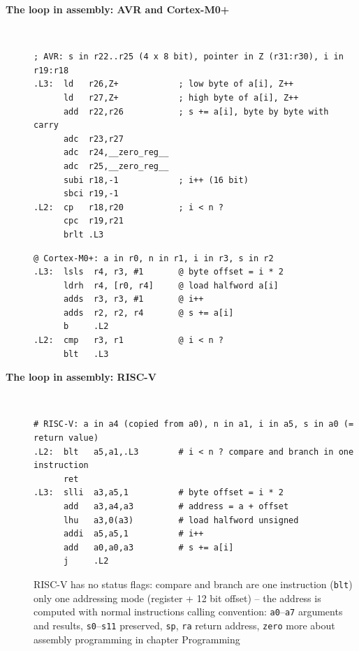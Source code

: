 \begin{description}
\item[{\rot\bf The loop in assembly: AVR and Cortex-M0+}]~\\[-\lstskip]
\begin{lstlisting}[language={}]
; AVR: s in r22..r25 (4 x 8 bit), pointer in Z (r31:r30), i in r19:r18
.L3:  ld   r26,Z+            ; low byte of a[i], Z++
      ld   r27,Z+            ; high byte of a[i], Z++
      add  r22,r26           ; s += a[i], byte by byte with carry
      adc  r23,r27
      adc  r24,__zero_reg__
      adc  r25,__zero_reg__
      subi r18,-1            ; i++ (16 bit)
      sbci r19,-1
.L2:  cp   r18,r20           ; i < n ?
      cpc  r19,r21
      brlt .L3
\end{lstlisting}
\begin{lstlisting}[language={}]
@ Cortex-M0+: a in r0, n in r1, i in r3, s in r2
.L3:  lsls  r4, r3, #1       @ byte offset = i * 2
      ldrh  r4, [r0, r4]     @ load halfword a[i]
      adds  r3, r3, #1       @ i++
      adds  r2, r2, r4       @ s += a[i]
      b     .L2
.L2:  cmp   r3, r1           @ i < n ?
      blt   .L3
\end{lstlisting}
\os{\newpage}

\item[{\rot\bf The loop in assembly: RISC-V}]~\\[-\lstskip]
\begin{lstlisting}[language={}]
# RISC-V: a in a4 (copied from a0), n in a1, i in a5, s in a0 (= return value)
.L2:  blt   a5,a1,.L3        # i < n ? compare and branch in one instruction
      ret
.L3:  slli  a3,a5,1          # byte offset = i * 2
      add   a3,a4,a3         # address = a + offset
      lhu   a3,0(a3)         # load halfword unsigned
      addi  a5,a5,1          # i++
      add   a0,a0,a3         # s += a[i]
      j     .L2
\end{lstlisting}
\bi
	\ite RISC-V has no status flags: compare and branch are one instruction (\texttt{blt})
	\ite only one addressing mode (register + 12 bit offset) -- the address is computed with normal instructions
	\ite calling convention: \texttt{a0}--\texttt{a7} arguments and results, \texttt{s0}--\texttt{s11} preserved, \texttt{sp}, \texttt{ra} return address, \texttt{zero}
	\ite more about assembly programming in chapter Programming
\ei
\os{\newpage}


\end{description}
